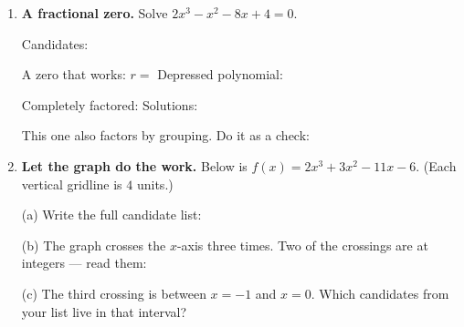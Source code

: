\documentclass[10pt]{article}
\newcommand{\lgrid}[4]{%
  \draw[step=1, linegray!40, very thin] (#1,#3) grid (#2,#4);
  \draw[->, semithick, charcoal] (#1,0)--(#2,0) node[below right, font=\scriptsize]{$x$};
  \draw[->, semithick, charcoal] (0,#3)--(0,#4) node[left, font=\scriptsize]{$y$};}
\begin{document}
\begin{tcolorbox}[colback=white, colframe=black!40, title=\textbf{Tier A --- Approaching Proficiency},
    fonttitle=\bfseries, arc=1.5mm, left=3mm, right=3mm, top=2mm, bottom=2mm, breakable]
\begin{enumerate}[leftmargin=1.7em, itemsep=10pt]
  \item \textbf{A fractional zero.} Solve $2x^3 - x^2 - 8x + 4 = 0$.

    \vspace{2pt}
    Candidates: \blank{6.0cm}

    \vspace{2pt}
    A zero that works: $r = $ \blank{1.0cm} \quad Depressed polynomial: \blank{3.0cm}

    \vspace{2pt}
    Completely factored: \blank{5.4cm} \quad Solutions: \blank{3.6cm}

    \vspace{2pt}
    This one also factors by grouping. Do it as a check: \blank{5.4cm}

  \item \textbf{Let the graph do the work.} Below is $f(x) = 2x^3 + 3x^2 - 11x - 6$.
    (Each vertical gridline is $4$ units.)
    \begin{center}
    \end{center}

    \vspace{2pt}
    (a) Write the full candidate list: \blank{6.0cm}

    \vspace{2pt}
    (b) The graph crosses the $x$-axis three times. Two of the crossings are at integers ---
    read them: \blank{2.6cm}

    \vspace{2pt}
    (c) The third crossing is between $x = -1$ and $x = 0$. Which candidates from your list live in
    that interval? \blank{3.0cm}


\end{enumerate}
\end{tcolorbox}
\end{document}
